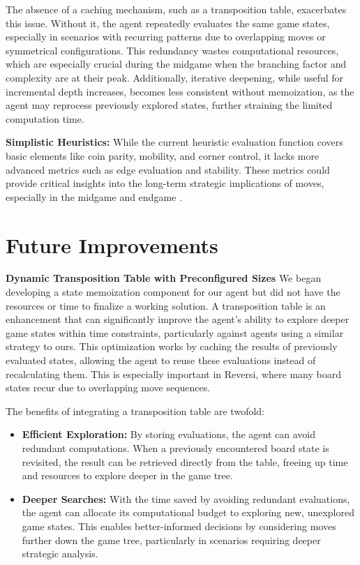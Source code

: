 \documentclass[11pt]{article}
\begin{document}
The absence of a caching mechanism, such as a transposition table, exacerbates this issue. Without it, the agent repeatedly evaluates the same game states, especially in scenarios with recurring patterns due to overlapping moves or symmetrical configurations. This redundancy wastes computational resources, which are especially crucial during the midgame when the branching factor and complexity are at their peak. Additionally, iterative deepening, while useful for incremental depth increases, becomes less consistent without memoization, as the agent may reprocess previously explored states, further straining the limited computation time.


\noindent \textbf{Simplistic Heuristics:}  
While the current heuristic evaluation function covers basic elements like coin parity, mobility, and corner control, it lacks more advanced metrics such as edge evaluation and stability. These metrics could provide critical insights into the long-term strategic implications of moves, especially in the midgame and endgame \cite{heuristics_in_othello}.

\section*{Future Improvements}
\noindent \textbf{Dynamic Transposition Table with Preconfigured Sizes}  
We began developing a state memoization component for our agent but did not have the resources or time to finalize a working solution. A transposition table is an enhancement that can significantly improve the agent's ability to explore deeper game states within time constraints, particularly against agents using a similar strategy to ours. This optimization works by caching the results of previously evaluated states, allowing the agent to reuse these evaluations instead of recalculating them. This is especially important in Reversi, where many board states recur due to overlapping move sequences.

The benefits of integrating a transposition table are twofold:
\begin{itemize}
    \item \textbf{Efficient Exploration:} By storing evaluations, the agent can avoid redundant computations. When a previously encountered board state is revisited, the result can be retrieved directly from the table, freeing up time and resources to explore deeper in the game tree.
    \item \textbf{Deeper Searches:} With the time saved by avoiding redundant evaluations, the agent can allocate its computational budget to exploring new, unexplored game states. This enables better-informed decisions by considering moves further down the game tree, particularly in scenarios requiring deeper strategic analysis.
\end{itemize}
\end{document}
